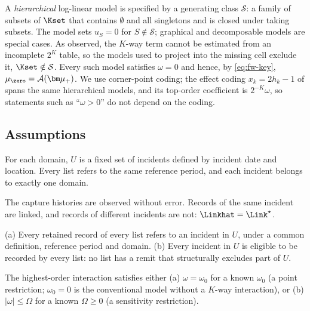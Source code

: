 A \emph{hierarchical} log-linear model is specified by a generating class $\mathcal S$: a family of subsets of $\Kset$ that contains $\emptyset$ and all singletons and is closed under taking subsets. The model sets $u_S=0$ for $S\notin\mathcal S$; graphical and decomposable models \citep{madigan1997} are special cases. As \citet{fienberg1972} observed, the $K$-way term cannot be estimated from an incomplete $2^K$ table, so the models used to project into the missing cell exclude it, $\Kset\notin\mathcal S$. Every such model satisfies $\omega=0$ and hence, by \eqref{eq:fw-key}, $\mu_{\zero}=\mathcal A(\bm\mu_+)$. We use corner-point coding; the effect coding $x_k=2h_k-1$ of \citet{bishop1975} spans the same hierarchical models, and its top-order coefficient is $2^{-K}\omega$, so statements such as ``$\omega>0$'' do not depend on the coding.

\subsection{Assumptions}\label{sec:fw-assumptions}

\begin{assumption}\label{asm:fw-closed}
For each domain, $U$ is a fixed set of incidents defined by incident date and location. Every list refers to the same reference period, and each incident belongs to exactly one domain.
\end{assumption}

\begin{assumption}\label{asm:fw-linkage}
The capture histories are observed without error. Records of the same incident are linked, and records of different incidents are not: $\Linkhat=\Link^\star$.
\end{assumption}

\begin{assumption}\label{asm:fw-scope}
(a) Every retained record of every list refers to an incident in $U$, under a common definition, reference period and domain. (b) Every incident in $U$ is eligible to be recorded by every list: no list has a remit that structurally excludes part of $U$.
\end{assumption}

\begin{assumption}\label{asm:fw-dependence}
The highest-order interaction satisfies either (a) $\omega=\omega_0$ for a known $\omega_0$ (a point restriction; $\omega_0=0$ is the conventional model without a $K$-way interaction), or (b) $|\omega|\le\Omega$ for a known $\Omega\ge0$ (a sensitivity restriction).
\end{assumption}

